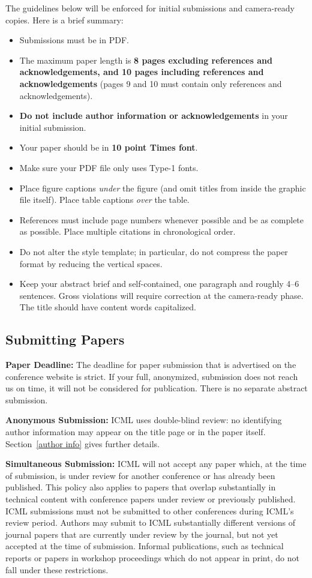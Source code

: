 \documentclass{article}
\begin{document}
The guidelines below will be enforced for initial submissions and
camera-ready copies. Here is a brief summary:
\begin{itemize}
\item Submissions must be in PDF\@.
\item The maximum paper length is \textbf{8 pages excluding references and
    acknowledgements, and 10 pages including references and acknowledgements}
    (pages 9 and 10 must contain only references and acknowledgements).
\item \textbf{Do not include author information or acknowledgements} in your
    initial submission.
\item Your paper should be in \textbf{10 point Times font}.
\item Make sure your PDF file only uses Type-1 fonts.
\item Place figure captions \emph{under} the figure (and omit titles from inside
    the graphic file itself). Place table captions \emph{over} the table.
\item References must include page numbers whenever possible and be as complete
    as possible. Place multiple citations in chronological order.
\item Do not alter the style template; in particular, do not compress the paper
    format by reducing the vertical spaces.
\item Keep your abstract brief and self-contained, one paragraph and roughly
    4--6 sentences. Gross violations will require correction at the
    camera-ready phase. The title should have content words capitalized.
\end{itemize}

\subsection{Submitting Papers}

\textbf{Paper Deadline:} The deadline for paper submission that is
advertised on the conference website is strict. If your full,
anonymized, submission does not reach us on time, it will not be
considered for publication. There is no separate abstract submission.

\textbf{Anonymous Submission:} ICML uses double-blind review: no identifying
author information may appear on the title page or in the paper
itself. Section~\ref{author info} gives further details.

\textbf{Simultaneous Submission:} ICML will not accept any paper which,
at the time of submission, is under review for another conference or
has already been published. This policy also applies to papers that
overlap substantially in technical content with conference papers
under review or previously published. ICML submissions must not be
submitted to other conferences during ICML's review period. Authors
may submit to ICML substantially different versions of journal papers
that are currently under review by the journal, but not yet accepted
at the time of submission. Informal publications, such as technical
reports or papers in workshop proceedings which do not appear in
print, do not fall under these restrictions.
\end{document}

